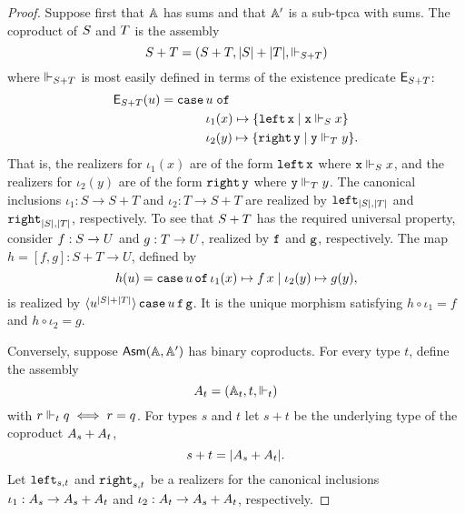 \begin{proof}
  Suppose first that $\AA$ has sums and that $\subAA$ is a sub-tpca
  with sums. The coproduct of $\asm{S}$ and $\asm{T}$ is the assembly
  \begin{equation*}
    \asm{S} + \asm{T} = (S + T, |S| + |T|, \rz[S + T])
  \end{equation*}
  where $\rz[S+T]$ is most easily defined in terms of the existence
  predicate $\Ex_{S+T}$:
  \begin{equation*}
    \Ex_{S+T}(u) =
    \xcase{u}
    {\iota_1(x)}{\set{\combLeft\,\R{x} \such \R{x} \rz[S] x}}
    {\iota_2(y)}{\set{\combRight\,\R{y} \such \R{y} \rz[T] y}.}
  \end{equation*}
  That is, the realizers for $\iota_1(x)$ are of the form
  $\combLeft\,\R{x}$ where $\R{x} \rz[S] x$, and the realizers for
  $\iota_2(y)$ are of the form $\combRight\,\R{y}$ where $\R{y} \rz[T]
  y$. The canonical inclusions $\iota_1 : S \to S + T$ and $\iota_2 :
  T \to S + T$ are realized by $\combLeft_{|S|,|T|}$ and
  $\combRight_{|S|,|T|}$, respectively.
  To see that $\asm{S} + \asm{T}$ has the required universal property,
  consider $f : \asm{S} \to \asm{U}$ and $g : \asm{T} \to \asm{U}$,
  realized by $\R{f}$ and $\R{g}$, respectively. The map $h = [f,g] :
  S + T \to U$, defined by
  \begin{equation*}
    h(u) = \case{u}{\iota_1(x)}{f\,x}{\iota_2(y)}{g(y)},
  \end{equation*}
  is realized by
  $\tpcalam{u}{|S|+|T|}{\combCase\,u\,\R{f}\,\R{g}}$. It is the
  unique morphism satisfying $h \circ \iota_1 = f$ and $h \circ
  \iota_2 = g$.

  Conversely, suppose $\AsmA$ has binary coproducts. For every type
  $t$, define the assembly
  \begin{equation*}
    \asm{A}_t = (\Atyp{t}, t, {\rz[t]})
  \end{equation*}
  with $r \rz[t] q \iff r = q$. For types $s$ and $t$ let $s+t$ be the
  underlying type of the coproduct $\asm{A}_s + \asm{A}_t$,
  \begin{equation*}
    s + t = |\asm{A}_s + \asm{A}_t|.
  \end{equation*}
  Let $\combLeft_{s,t}$ and $\combRight_{s,t}$ be a realizers for the
  canonical inclusions $\iota_1 : \asm{A}_s \to \asm{A}_s + \asm{A}_t$
  and $\iota_2 : \asm{A}_t \to \asm{A}_s + \asm{A}_t$, respectively.


\end{proof}
